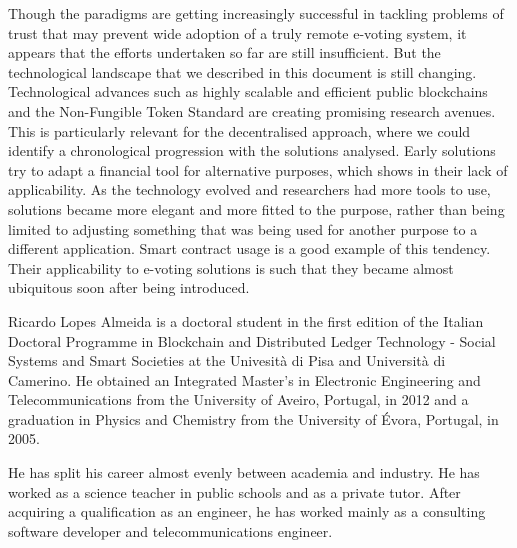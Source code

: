 \documentclass{ieeeaccess}
\begin{document}
\par
Though the paradigms are getting increasingly successful in tackling problems of trust that may prevent wide adoption of a truly remote e-voting system, it appears that the efforts undertaken so far are still insufficient. But the technological landscape that we described in this document is still changing. Technological advances such as highly scalable and efficient public blockchains and the Non-Fungible Token Standard are creating promising research avenues.
This is particularly relevant for the decentralised approach, where we could identify a chronological progression with the solutions analysed. Early solutions try to adapt a financial tool for alternative purposes, which shows in their lack of applicability. As the technology evolved and researchers had more tools to use, solutions became more elegant and more fitted to the purpose, rather than being limited to adjusting something that was being used for another purpose to a different application. Smart contract usage is a good example of this tendency. Their applicability to e-voting solutions is such that they became almost ubiquitous soon after being introduced.




\begin{IEEEbiography}{Ricardo Lopes Almeida} is a doctoral student in the first edition of the Italian Doctoral Programme in Blockchain and Distributed Ledger Technology - Social Systems and Smart Societies at the Univesità di Pisa and Università di Camerino. He obtained an Integrated Master's in Electronic Engineering and Telecommunications from the University of Aveiro, Portugal, in 2012 and a graduation in Physics and Chemistry from the University of \'Evora, Portugal, in 2005.
\par
He has split his career almost evenly between academia and industry. He has worked as a science teacher in public schools and as a private tutor. After acquiring a qualification as an engineer, he has worked mainly as a consulting software developer and telecommunications engineer. 
\end{IEEEbiography}
\end{document}
